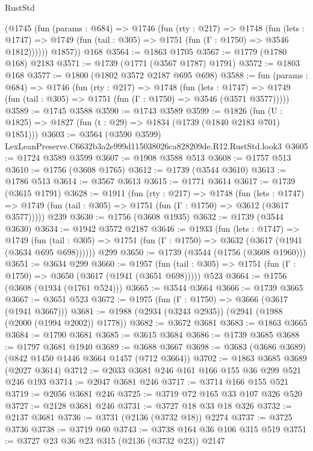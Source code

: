 \begin{lexlean}{RustStd}
\begin{coremodule}
        (@1745
          (fun (params : @684) =>
          @1746
            (fun (rty : @217) =>
            @1748
              (fun (lets : @1747) =>
              @1749 (fun (tail : @305) => @1751 (fun (Γ : @1750) => @3546 @1812))))))
        @1857))
    @168
@3564 := @1863 @1705
@3567 := @1779 (@1780 @168) @2183
@3571 := @1739 (@1771 (@3567 @1787) @1791)
@3572 := @1803 @168
@3577 := @1800 (@1802 @3572 @2187 @695 @698)
@3588 := fun (params : @684) =>
  @1746
    (fun (rty : @217) =>
    @1748
      (fun (lets : @1747) =>
      @1749 (fun (tail : @305) => @1751 (fun (Γ : @1750) => @3546 (@3571 @3577)))))
@3589 := @1745 @3588
@3590 := @1743 @3589
@3599 := @1826 (fun (U : @1825) => @1827 (fun (t : @29) => @1834 (@1739 (@1840 @2183 @701) @1851)))
@3603 := @3564 (@3590 @3599) LexLeanPreserve.C6632b3a2e999d115038026ca828209de.R12.RustStd.look3
@3605 := @1724 @3589 @3599
@3607 := @1908 @3588 @513
@3608 := @1757 @513
@3610 := @1756 (@3608 @1765)
@3612 := @1739 (@3544 @3610)
@3613 := @1786 @513
@3614 := @3567 @3613
@3615 := @1771 @3614
@3617 := @1739 (@3615 @1791)
@3628 := @1911
    (fun (rty : @217) =>
    @1748
      (fun (lets : @1747) =>
      @1749 (fun (tail : @305) => @1751 (fun (Γ : @1750) => @3612 (@3617 @3577)))))
    @239
@3630 := @1756 (@3608 @1935)
@3632 := @1739 (@3544 @3630)
@3634 := @1942 @3572 @2187
@3646 := @1933
    (fun (lets : @1747) =>
    @1749 (fun (tail : @305) => @1751 (fun (Γ : @1750) => @3632 (@3617 (@1941 (@3634 @695 @698))))))
    @299
@3650 := @1739 (@3544 (@1756 (@3608 @1960)))
@3651 := @3634 @299
@3660 := @1957
    (fun (tail : @305) => @1751 (fun (Γ : @1750) => @3650 (@3617 (@1941 (@3651 @698)))))
    @523
@3664 := @1756 (@3608 (@1934 (@1761 @524)))
@3665 := @3544 @3664
@3666 := @1739 @3665
@3667 := @3651 @523
@3672 := @1975 (fun (Γ : @1750) => @3666 (@3617 (@1941 @3667)))
@3681 := @1988 (@2934 (@3243 @2935)) (@2941 (@1988 (@2000 (@1994 @2002)) @1778))
@3682 := @3672 @3681
@3683 := @1863 @3665
@3684 := @1790 @3681
@3685 := @3615 @3684
@3686 := @1739 @3685
@3688 := @1797 @3681 @1940
@3689 := @3688 @3667
@3698 := @3683 (@3686 @3689) (@842 @1450 @1446 @3664 @1457 (@712 @3664))
@3702 := @1863 @3685 @3689 (@2027 @3614)
@3712 := @2033 @3681 @246 @161 @166 @155 @36 @299 @521 @246 @193
@3714 := @2047 @3681 @246
@3717 := @3714 @166 @155 @521
@3719 := @2056 @3681 @246
@3725 := @3719 @72 @165 @33 @107 @326 @520
@3727 := @2128 @3681 @246
@3731 := @3727 @18 @33 @18 @326
@3732 := @2137 @3681
@3736 := @3731 (@2136 (@3732 @18)) @2274
@3737 := @3725 @3736
@3738 := @3719 @60
@3743 := @3738 @164 @36 @106 @315 @519
@3751 := @3727 @23 @36 @23 @315 (@2136 (@3732 @23)) @2147

\end{coremodule}
\end{lexlean}
